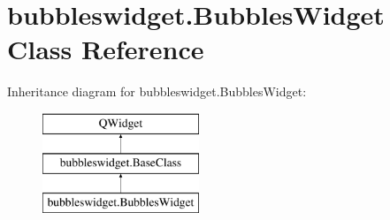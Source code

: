 \hypertarget{classbubbleswidget_1_1BubblesWidget}{}\section{bubbleswidget.\+Bubbles\+Widget Class Reference}
\label{classbubbleswidget_1_1BubblesWidget}
Inheritance diagram for bubbleswidget.\+Bubbles\+Widget\+:\begin{figure}[H]
\begin{center}
\leavevmode
\includegraphics[height=3.000000cm]{classbubbleswidget_1_1BubblesWidget}
\end{center}
\end{figure}

